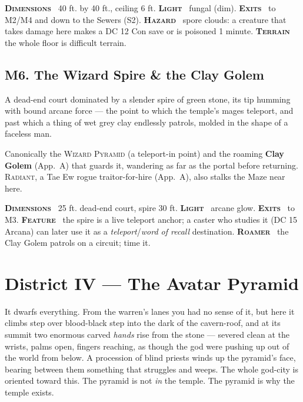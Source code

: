 \documentclass[10pt,twoside]{article}
\newcommand{\tech}[1]{\textbf{\scshape\textcolor{stone}{#1}}\ }
\newcommand{\eqname}[1]{\textsc{#1}}
\begin{document}
\begin{techbox}
\tech{Dimensions} 40 ft. by 40 ft., ceiling 6 ft. \tech{Light} fungal (dim).
\tech{Exits} to M2/M4 and down to the Sewers (S2). \tech{Hazard} spore clouds: a
creature that takes damage here makes a DC 12 Con save or is poisoned 1 minute.
\tech{Terrain} the whole floor is difficult terrain.
\end{techbox}

\subsection{M6. The Wizard Spire \& the Clay Golem}
\begin{readaloud}
A dead-end court dominated by a slender spire of green stone, its tip humming with
bound arcane force --- the point to which the temple's mages teleport, and past which
a thing of wet grey clay endlessly patrols, molded in the shape of a faceless man.
\end{readaloud}
Canonically the \eqname{Wizard Pyramid} (a teleport-in point) and the roaming
\textbf{Clay Golem} (App.\ A) that guards it, wandering as far as the portal before
returning. \eqname{Radiant}, a Tae Ew rogue traitor-for-hire (App.\ A), also stalks
the Maze near here.

\begin{techbox}
\tech{Dimensions} 25 ft. dead-end court, spire 30 ft. \tech{Light} arcane glow.
\tech{Exits} to M3. \tech{Feature} the spire is a live teleport anchor; a caster who
studies it (DC 15 Arcana) can later use it as a \textit{teleport}/\textit{word of
recall} destination. \tech{Roamer} the Clay Golem patrols on a circuit; time it.
\end{techbox}
\clearpage
\section{District IV --- The Avatar Pyramid}

\begin{readaloud}
It dwarfs everything. From the warren's lanes you had no sense of it, but here it
climbs step over blood-black step into the dark of the cavern-roof, and at its
summit two enormous carved \emph{hands} rise from the stone --- severed clean at the
wrists, palms open, fingers reaching, as though the god were pushing up out of the
world from below. A procession of blind priests winds up the pyramid's face, bearing
between them something that struggles and weeps. The whole god-city is oriented
toward this. The pyramid is not \emph{in} the temple. The pyramid is why the temple
exists.
\end{readaloud}
\end{document}
